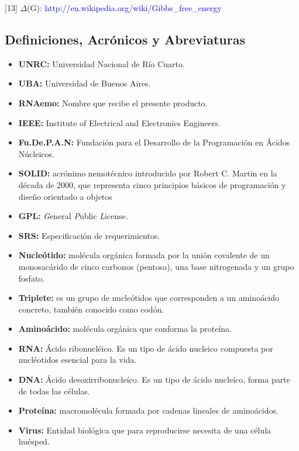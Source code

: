 \documentclass[10pt,a4paper,english,spanish]{article}
\begin{document}
[13] $\Delta$(G): \textcolor{blue}{http://en.wikipedia.org/wiki/Gibbs\_free\_energy} 

\subsection{Definiciones, Acrónicos y Abreviaturas}
\begin{itemize}
	\item \textbf{UNRC:} Universidad Nacional de Río Cuarto.
	\item \textbf{UBA:} Universidad de Buenos Aires.
	\item \textbf{RNAemo:} Nombre que recibe el presente producto.
	\item \textbf{IEEE:} Institute of Electrical and Electronics Engineers.
	\item \textbf{Fu.De.P.A.N:} Fundación para el Desarrollo de la Programación en Ácidos Núcleicos.
	\item \textbf{SOLID:} acrónimo nemotécnico introducido por Robert C. Martin en la
							década de 2000, que representa cinco principios básicos de programación
							y diseño orientado a objetos
	\item \textbf{GPL:} \textit{G}eneral \textit{P}ublic \textit{L}icense.	
	\item \textbf{SRS:} Especificación de requerimientos.
	\item \textbf{Nucleótido:} molécula orgánica formada por la unión covalente de un monosacárido de cinco carbonos (pentosa), una base nitrogenada y un 								   grupo fosfato.
	\item \textbf{Triplete:} es un grupo de nucleótidos que corresponden a un aminoácido concreto, también conocido como codón.
	\item \textbf{Aminoácido:} molécula orgánica que conforma la proteína.
	\item \textbf{RNA:} Ácido ribonucléico. Es un tipo de ácido nucleico compuesta por nucléotidos esencial para la vida.
	\item \textbf{DNA:} Ácido desoxirribonucleíco. Es un tipo de ácido nucleico, forma parte de todas las células.
	\item \textbf{Proteína:} macromolécula formada por cadenas lineales de aminoácidos.
	\item \textbf{Virus:} Entidad biológica que para reproducirse necesita de una célula huésped.	

\end{itemize}
\end{document}
